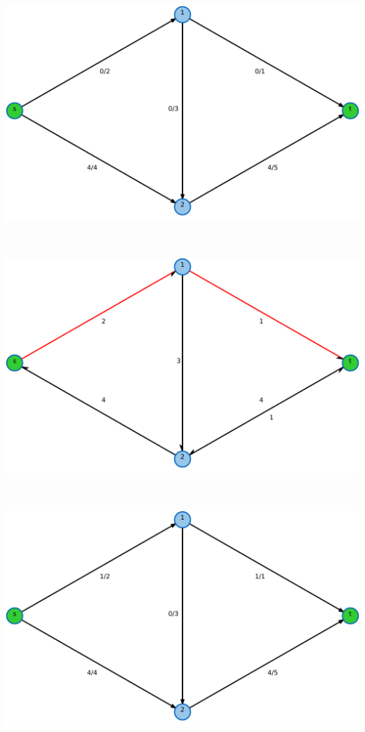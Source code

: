 \pagebreak
\begin{center}
\begin{minipage}[t]{0.65\textwidth}
    \includegraphics[width=\textwidth]{img/ford-fulkerson-1.pdf}
\end{minipage}
\\
\begin{minipage}[t]{0.65\textwidth}
    \includegraphics[width=\textwidth]{img/ford-fulkerson-2.pdf}
\end{minipage}
\\
\begin{minipage}[t]{0.65\textwidth}
    \includegraphics[width=\textwidth]{img/ford-fulkerson-3.pdf}
\end{minipage}
\end{center}

